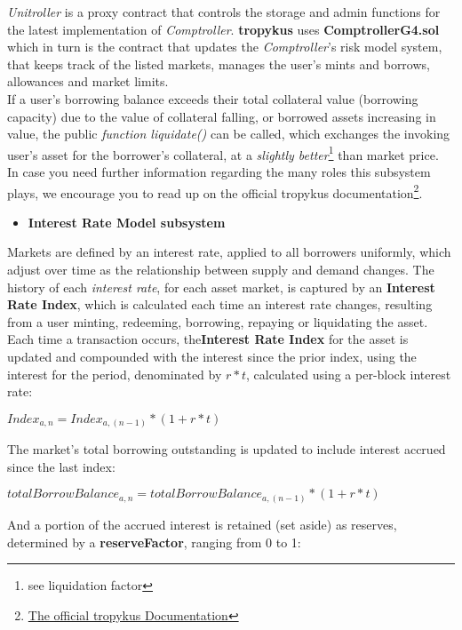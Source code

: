 \documentclass{article}
\begin{document}
\textit{Unitroller} is a proxy contract that controls the storage and admin functions for the latest implementation of \textit{Comptroller}. \textbf{tropykus} uses \textbf{ComptrollerG4.sol} which in turn is the contract that updates the \textit{Comptroller}'s risk model system, that keeps track of the listed markets, manages the user's mints and borrows, allowances and market limits.
\\
If a user's borrowing balance exceeds their total collateral value (borrowing capacity) due to the value of collateral falling, or borrowed assets increasing in value, the public \textit{function liquidate()} can be called, which exchanges the invoking user's asset for the borrower's collateral, at a \textit{slightly better}\footnote{see liquidation factor} than market price.
\\
In case you need further information regarding the many roles this subsystem plays, we encourage you to read up on the official tropykus documentation\footnote{\href{https://tropykus.app/docs}{The official tropykus Documentation}}.


\begin{itemize}
\item \textbf{Interest Rate Model subsystem}
\end{itemize}

Markets are defined by an interest rate, applied to all borrowers uniformly, which adjust over time as the relationship between supply and demand changes. The history of each \textit{interest rate}, for each asset market, is captured by an \textbf{Interest Rate Index}, which is calculated each time an interest rate changes, resulting from a user minting, redeeming, borrowing, repaying or liquidating the asset.
Each time a transaction occurs, the\textbf{Interest Rate Index} for the asset is updated and compounded with the interest since the prior index, using the interest for the period, denominated by $r * t$, calculated using a per-block interest rate:
\begin{center}
$Index_{a,n}= Index_{a,(n-1)}*(1+r*t)$
\end{center}

The market’s total borrowing outstanding is updated to include interest accrued since the last index:

\begin{center}
$totalBorrowBalance_{a,n}= totalBorrowBalance_{a,(n-1)}*(1+r*t)$
\end{center}

And a portion of the accrued interest is retained (set aside) as reserves, determined by a
\textbf{reserveFactor}, ranging from 0 to 1:
\end{document}
